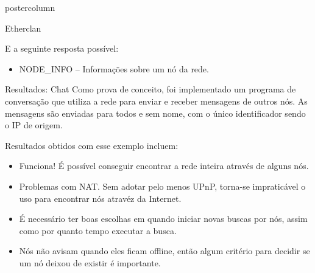 \documentclass[final]{beamer}
\begin{document}
\begin{frame}
\begin{columns}
\begin{column}{.5\textwidth}
\begin{beamercolorbox}[center,wd=\textwidth]{postercolumn}
\begin{minipage}[T]{.95\textwidth}
{\begin{block}{Etherclan}
                \vspace*{0.2cm}
                
                E a seguinte resposta possível:
                \begin{itemize}
                  \item NODE\_INFO -- Informações sobre um nó da rede.
                \end{itemize}
                
                \vspace*{0.2cm} 
            \end{block}

            \vspace*{0.2cm} 
            
            \begin{block}{Resultados: Chat}
              \justifying 
                Como prova de conceito, foi implementado um programa de conversação que utiliza a rede para enviar e receber
                mensagens de outros nós. As mensagens são enviadas para todos e sem nome, com o único identificador sendo o IP
                de origem.
                
                
                \vspace*{0.4cm}
                
                Resultados obtidos com esse exemplo incluem:
                \begin{itemize}
                  \item Funciona! É possível conseguir encontrar a rede inteira através de alguns nós.
                  \item Problemas com NAT. Sem adotar pelo menos UPnP, torna-se impraticável o uso para encontrar nós atravéz da Internet.
                  \item É necessário ter boas escolhas em quando iniciar novas buscas por nós, assim como por quanto tempo executar a busca.
                  \item Nós não avisam quando eles ficam offline, então algum critério para decidir se um nó deixou de existir é importante.
                \end{itemize}
                

\end{block}}
\end{minipage}
\end{beamercolorbox}
\end{column}
\end{columns}
\end{frame}
\end{document}
